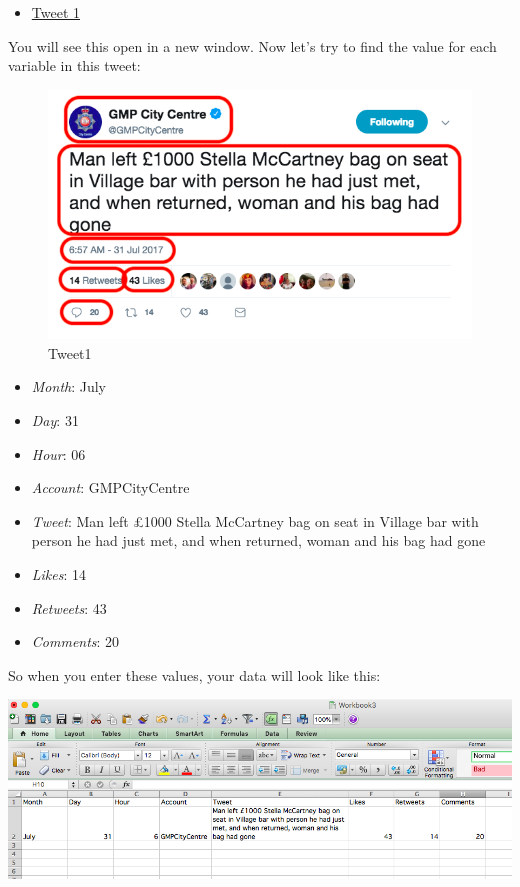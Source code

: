 \documentclass[]{book}
\providecommand{\tightlist}{%
  \setlength{\itemsep}{0pt}\setlength{\parskip}{0pt}}
\theoremstyle{definition}
\theoremstyle{definition}
\theoremstyle{definition}
\theoremstyle{remark}
\begin{document}
\begin{itemize}
\tightlist
\item
  \href{https://twitter.com/GMPCityCentre/status/891900693585506304}{Tweet
  1}
\end{itemize}

You will see this open in a new window. Now let's try to find the value
for each variable in this tweet:

\begin{figure}
\centering
\includegraphics{imgs/tweet1.png}
\caption{Tweet1}
\end{figure}

\begin{itemize}
\tightlist
\item
  \emph{Month}: July
\item
  \emph{Day}: 31
\item
  \emph{Hour}: 06
\item
  \emph{Account}: GMPCityCentre
\item
  \emph{Tweet}: Man left £1000 Stella McCartney bag on seat in Village
  bar with person he had just met, and when returned, woman and his bag
  had gone
\item
  \emph{Likes}: 14
\item
  \emph{Retweets}: 43
\item
  \emph{Comments}: 20
\end{itemize}

So when you enter these values, your data will look like this:

\includegraphics{imgs/tweet1_entered.png}
\end{document}
